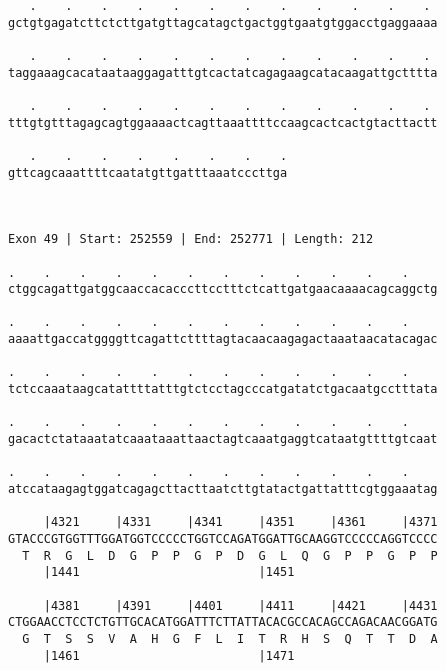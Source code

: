 \documentclass{article}
\begin{document}
\begin{Verbatim}
   .    .    .    .    .    .    .    .    .    .    .    . 
gctgtgagatcttctcttgatgttagcatagctgactggtgaatgtggacctgaggaaaa
                                                            
   .    .    .    .    .    .    .    .    .    .    .    . 
taggaaagcacataataaggagatttgtcactatcagagaagcatacaagattgctttta
                                                            
   .    .    .    .    .    .    .    .    .    .    .    . 
tttgtgtttagagcagtggaaaactcagttaaattttccaagcactcactgtacttactt
                                                            
   .    .    .    .    .    .    .    .
gttcagcaaattttcaatatgttgatttaaatcccttga
                                       
                                       
 
Exon 49 | Start: 252559 | End: 252771 | Length: 212
 
.    .    .    .    .    .    .    .    .    .    .    .    
ctggcagattgatggcaaccacacccttcctttctcattgatgaacaaaacagcaggctg
                                                            
.    .    .    .    .    .    .    .    .    .    .    .    
aaaattgaccatggggttcagattcttttagtacaacaagagactaaataacatacagac
                                                            
.    .    .    .    .    .    .    .    .    .    .    .    
tctccaaataagcatattttatttgtctcctagcccatgatatctgacaatgcctttata
                                                            
.    .    .    .    .    .    .    .    .    .    .    .    
gacactctataaatatcaaataaattaactagtcaaatgaggtcataatgttttgtcaat
                                                            
.    .    .    .    .    .    .    .    .    .    .    .    
atccataagagtggatcagagcttacttaatcttgtatactgattatttcgtggaaatag
                                                            
     |4321     |4331     |4341     |4351     |4361     |4371
GTACCCGTGGTTTGGATGGTCCCCCTGGTCCAGATGGATTGCAAGGTCCCCCAGGTCCCC
  T  R  G  L  D  G  P  P  G  P  D  G  L  Q  G  P  P  G  P  P
     |1441                         |1451                    
  
     |4381     |4391     |4401     |4411     |4421     |4431
CTGGAACCTCCTCTGTTGCACATGGATTTCTTATTACACGCCACAGCCAGACAACGGATG
  G  T  S  S  V  A  H  G  F  L  I  T  R  H  S  Q  T  T  D  A
     |1461                         |1471                    
  

\end{Verbatim}
\end{document}
